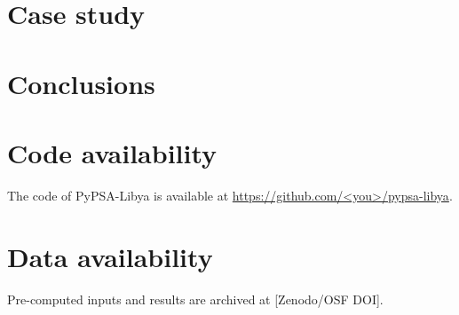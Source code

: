 \documentclass[preprint,12pt]{elsarticle}
\begin{document}
\section{Case study}

\section{Conclusions}

\section*{Code availability}
The code of PyPSA-Libya is available at
\url{https://github.com/<you>/pypsa-libya}.

\section*{Data availability}
Pre-computed inputs and results are archived at [Zenodo/OSF DOI].



\end{document}

